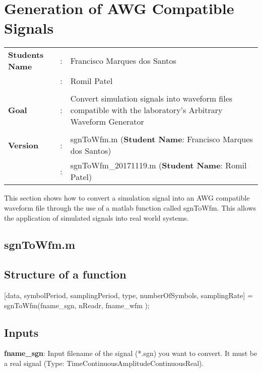 \clearpage
\graphicspath{{./mtools/sgnToWfm/figures/}}
\section{Generation of AWG Compatible Signals}

\begin{tcolorbox}	
	\begin{tabular}{p{2.75cm} p{0.2cm} p{10.5cm}} 	
		\textbf{Students Name}  &:& Francisco Marques dos Santos\\
						   	    &:& Romil Patel\\\\
		\textbf{Goal}           &:& Convert simulation signals into waveform files compatible with the laboratory's Arbitrary Waveform Generator\\\\
		\textbf{Version}        &:& sgnToWfm.m (\textbf{Student Name}: Francisco Marques dos Santos)\\
							    &:& sgnToWfm\_20171119.m (\textbf{Student Name}: Romil Patel)
	\end{tabular}
\end{tcolorbox}


This section shows how to convert a simulation signal into an AWG compatible waveform file through the use of a matlab function called sgnToWfm. This allows the application of simulated signals into real world systems.

\subsection{sgnToWfm.m}

\subsection*{Structure of a function}

[data, symbolPeriod, samplingPeriod, type, numberOfSymbols, samplingRate] = sgnToWfm(fname\_sgn, nReadr, fname\_wfm );

\subsection*{Inputs}

\indent

\textbf{fname\_sgn}: Input filename of the signal (*.sgn) you want to convert. It must be a real signal (Type: TimeContinuousAmplitudeContinuousReal).
\bigskip

